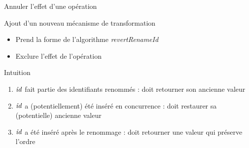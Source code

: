 \begin{frame}{Annuler l'effet d'une opération \ren}
  \begin{block}{Ajout d'un nouveau mécanisme de transformation}
    \begin{itemize}
      \pause
      \item Prend la forme de l'algorithme \emph{revertRenameId}
      \pause
      \item \alert{Exclure l'effet de l'opération \ren}
    \end{itemize}
  \end{block}
  \pause
  \begin{block}{Intuition}
    \begin{enumerate}
      \pause
      \item $\mathit{id}$ fait partie des identifiants renommés : doit retourner son ancienne valeur
      \pause
      \item $\mathit{id}$ a (potentiellement) été inséré en concurrence : doit restaurer sa (potentielle) ancienne valeur
      \pause
      \item $\mathit{id}$ a été inséré après le renommage : doit retourner une valeur qui préserve l'ordre
    \end{enumerate}
  \end{block}
\end{frame}

